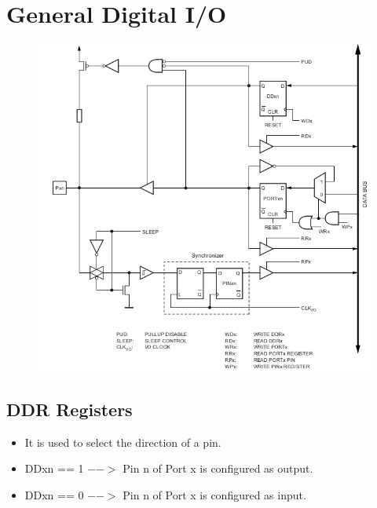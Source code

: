 \documentclass{article}
\begin{document}
\section{General Digital I/O}
\begin{figure}[H]
    \begin{center}
        \includegraphics[width=1\textwidth]{IOcomplete.png}
    \end{center}
\end{figure}

\subsection{DDR Registers}
\begin{itemize}
    \item It is used to select the direction of a pin.
    \item DDxn == 1 $-->$ Pin n of Port x is configured as output.
    \item DDxn == 0 $-->$ Pin n of Port x is configured as input.
\end{itemize}
\end{document}
